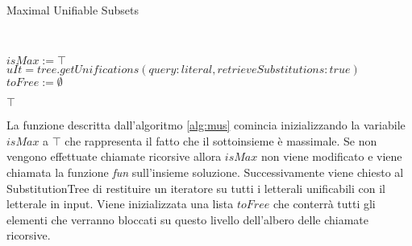\documentclass[./main.tex]{subfiles}
\begin{document}
\begin{algorithm}[H] \label{alg:mus}
    \small
    \caption{Maximal Unifiable Subsets}
    \\

$isMax := \top$\;
$uIt = tree.getUnifications(query: literal, retrieveSubstitutions: true)$\;
$toFree := \emptyset$\;

\Return $\top$\;
\end{algorithm}

La funzione descritta dall'algoritmo \ref{alg:mus} comincia inizializzando la variabile $isMax$ a $\top$ che rappresenta il fatto che il sottoinsieme è massimale.
Se non vengono effettuate chiamate ricorsive allora $isMax$ non viene modificato
e viene chiamata la funzione \textit{fun} sull'insieme soluzione.
Successivamente viene chiesto al SubstitutionTree di restituire un iteratore
su tutti i letterali unificabili con il letterale in input.
Viene inizializzata una lista $toFree$ che conterrà tutti gli elementi che 
verranno bloccati su questo livello dell'albero delle chiamate ricorsive.
\end{document}
